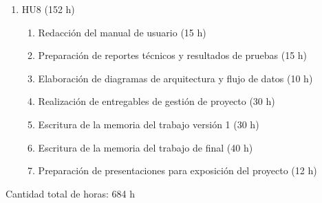 \documentclass[
11pt, %
]{charter}
\begin{document}
\begin{enumerate}
\item HU8 (152 h)
\begin{enumerate}
\item Redacción del manual de usuario (15 h)
\item Preparación de reportes técnicos y resultados de pruebas (15 h)
\item Elaboración de diagramas de arquitectura y flujo de datos (10 h)
\item Realización de entregables de gestión de proyecto (30 h)
\item Escritura de la memoria del trabajo versión 1 (30 h)
\item Escritura de la memoria del trabajo de final  (40 h)
\item Preparación de presentaciones para exposición del proyecto (12 h)
\end{enumerate}
\end{enumerate}

Cantidad total de horas: 684 h
\end{document}
